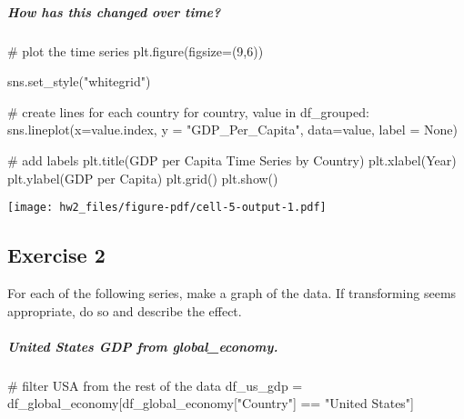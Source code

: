 \documentclass[
  11pt,
]{article}
\let\oldsubparagraph\subparagraph
\renewcommand{\subparagraph}[1]{\oldsubparagraph{#1}\mbox{}}
\newenvironment{Shaded}{\begin{snugshade}}{\end{snugshade}}
\newcommand{\CommentTok}[1]{\textcolor[rgb]{0.37,0.37,0.37}{#1}}
\newcommand{\ControlFlowTok}[1]{\textcolor[rgb]{0.00,0.23,0.31}{#1}}
\newcommand{\DecValTok}[1]{\textcolor[rgb]{0.68,0.00,0.00}{#1}}
\newcommand{\KeywordTok}[1]{\textcolor[rgb]{0.00,0.23,0.31}{#1}}
\newcommand{\NormalTok}[1]{\textcolor[rgb]{0.00,0.23,0.31}{#1}}
\newcommand{\OperatorTok}[1]{\textcolor[rgb]{0.37,0.37,0.37}{#1}}
\newcommand{\StringTok}[1]{\textcolor[rgb]{0.13,0.47,0.30}{#1}}
\newcommand{\VariableTok}[1]{\textcolor[rgb]{0.07,0.07,0.07}{#1}}
\begin{document}
\subparagraph{How has this changed over
time?}\label{how-has-this-changed-over-time}

\begin{Shaded}
\begin{Highlighting}[]
\CommentTok{\# plot the time series}
\NormalTok{plt.figure(figsize}\OperatorTok{=}\NormalTok{(}\DecValTok{9}\NormalTok{,}\DecValTok{6}\NormalTok{))}

\NormalTok{sns.set\_style(}\StringTok{"whitegrid"}\NormalTok{)}

\CommentTok{\# create lines for each country}
\ControlFlowTok{for}\NormalTok{ country, value }\KeywordTok{in}\NormalTok{ df\_grouped:}
\NormalTok{    sns.lineplot(x}\OperatorTok{=}\NormalTok{value.index, }
\NormalTok{                 y }\OperatorTok{=} \StringTok{"GDP\_Per\_Capita"}\NormalTok{, }
\NormalTok{                 data}\OperatorTok{=}\NormalTok{value, label }\OperatorTok{=} \VariableTok{None}\NormalTok{)}

\CommentTok{\# add labels}
\NormalTok{plt.title(}\StringTok{\textquotesingle{}GDP per Capita Time Series by Country\textquotesingle{}}\NormalTok{)}
\NormalTok{plt.xlabel(}\StringTok{\textquotesingle{}Year\textquotesingle{}}\NormalTok{)}
\NormalTok{plt.ylabel(}\StringTok{\textquotesingle{}GDP per Capita\textquotesingle{}}\NormalTok{)}
\NormalTok{plt.grid()}
\NormalTok{plt.show()}
\end{Highlighting}
\end{Shaded}

\texttt{[image: hw2\_files/figure-pdf/cell-5-output-1.pdf]}

\subsection{Exercise 2}\label{exercise-2}

For each of the following series, make a graph of the data. If
transforming seems appropriate, do so and describe the effect.

\subparagraph{United States GDP from
global\_economy.}\label{united-states-gdp-from-global_economy.}

\begin{Shaded}
\begin{Highlighting}[]
\CommentTok{\# filter USA from the rest of the data}
\NormalTok{df\_us\_gdp }\OperatorTok{=}\NormalTok{ df\_global\_economy[df\_global\_economy[}\StringTok{"Country"}\NormalTok{] }\OperatorTok{==} \StringTok{"United States"}\NormalTok{]}
\end{Highlighting}
\end{Shaded}
\end{document}
